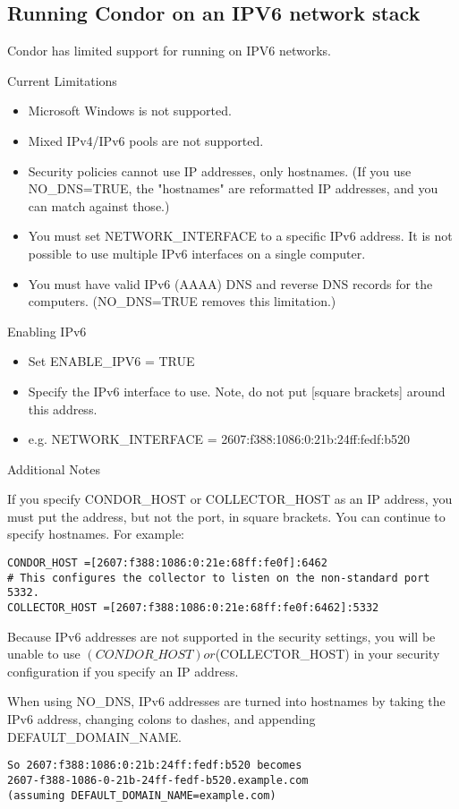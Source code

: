 \subsection{\label{sec:ipv6}Running Condor on an IPV6 network stack}


Condor has limited support for running on IPV6 networks.

Current Limitations

\begin{itemize}
    \item{Microsoft Windows is not supported.}
    \item{Mixed IPv4/IPv6 pools are not supported.}
    \item{Security policies cannot use IP addresses, only hostnames. (If you use NO\_DNS=TRUE, the "hostnames" are reformatted IP addresses, and you can match against those.)}
    \item{You must set NETWORK\_INTERFACE to a specific IPv6 address. It is not possible to use multiple IPv6 interfaces on a single computer.}
    \item{You must have valid IPv6 (AAAA) DNS and reverse DNS records for the computers. (NO\_DNS=TRUE removes this limitation.)}
\end{itemize}

Enabling IPv6

\begin{itemize}
    \item{Set ENABLE\_IPV6 = TRUE}
    \item{Specify the IPv6 interface to use. Note, do not put [square brackets] around this address.}
    \item{e.g. NETWORK\_INTERFACE = 2607:f388:1086:0:21b:24ff:fedf:b520}
\end{itemize}

Additional Notes

If you specify CONDOR\_HOST or COLLECTOR\_HOST as an IP address, you must put the address, but not the port, in square brackets. You can continue to specify hostnames. For example:

\begin{verbatim}
CONDOR_HOST =[2607:f388:1086:0:21e:68ff:fe0f]:6462
# This configures the collector to listen on the non-standard port 5332.
COLLECTOR_HOST =[2607:f388:1086:0:21e:68ff:fe0f:6462]:5332
\end{verbatim}

Because IPv6 addresses are not supported in the security settings, you will be unable to use $(CONDOR\_HOST) or $(COLLECTOR\_HOST) in your security configuration if you specify an IP address.

When using NO\_DNS, IPv6 addresses are turned into hostnames by taking the IPv6 address, changing colons to dashes, and appending DEFAULT\_DOMAIN\_NAME. 
\begin{verbatim}
So 2607:f388:1086:0:21b:24ff:fedf:b520 becomes 
2607-f388-1086-0-21b-24ff-fedf-b520.example.com 
(assuming DEFAULT_DOMAIN_NAME=example.com)
\end{verbatim}
